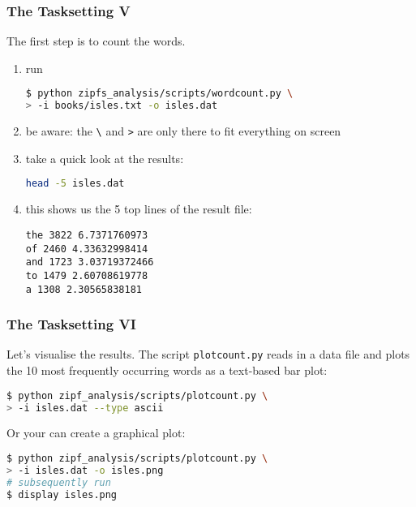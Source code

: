 \begin{frame}[fragile]
  \frametitle{The Tasksetting V}
  The first step is to count the words.\newline
  \begin{enumerate}
   \item run \begin{lstlisting}[language=Bash, style=Shell, basicstyle=\footnotesize] 
$ python zipfs_analysis/scripts/wordcount.py \
> -i books/isles.txt -o isles.dat           
             \end{lstlisting}
  \item be aware: the \texttt{\textbackslash} and \texttt{>} are only there to fit everything on screen
  \item take a quick look at the results:
        \begin{lstlisting}[language=Bash, style=Shell] 
head -5 isles.dat
        \end{lstlisting}
  \item this shows us the 5 top lines of the result file:
  \begin{lstlisting}[style=Plain]
the 3822 6.7371760973
of 2460 4.33632998414
and 1723 3.03719372466
to 1479 2.60708619778
a 1308 2.30565838181
  \end{lstlisting}
   \end{enumerate}
\end{frame}

\begin{frame}[fragile]
  \frametitle{The Tasksetting VI}
  Let’s visualise the results. The script \texttt{plotcount.py} reads in a data file and plots the 10 most frequently occurring words as a text-based bar plot:
  \begin{lstlisting}[language=Bash, style=Shell] 
$ python zipf_analysis/scripts/plotcount.py \
> -i isles.dat --type ascii
  \end{lstlisting}
  \pause
  Or your can create a graphical plot:
  \begin{lstlisting}[language=Bash, style=Shell] 
$ python zipf_analysis/scripts/plotcount.py \
> -i isles.dat -o isles.png
# subsequently run
$ display isles.png
  \end{lstlisting}
\end{frame}

